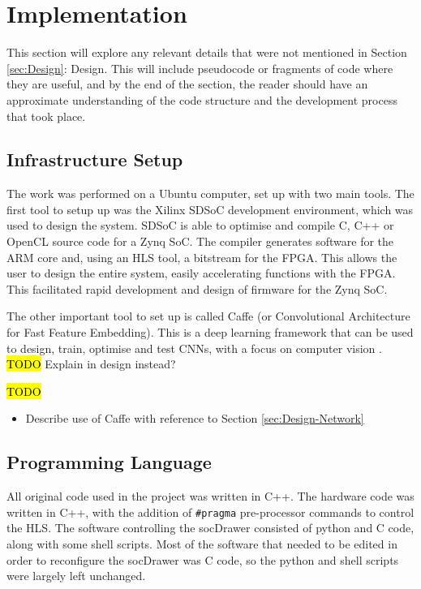 \documentclass[12pt]{article}
\begin{document}
\newpage

\section{Implementation}
\label{sec:Imp}


This section will explore any relevant details that were not mentioned in Section \ref{sec:Design}: Design. This will include pseudocode or fragments of code where they are useful, and by the end of the section, the reader should have an approximate understanding of the code structure and the development process that took place.

\subsection{Infrastructure Setup}
\label{sec:Imp-InfSetup}


The work was performed on a Ubuntu computer, set up with two main tools. The first tool to setup up was the Xilinx SDSoC development environment, which was used to design the system. SDSoC is able to optimise and compile C, C++ or OpenCL source code for a Zynq SoC. The compiler generates software for the ARM core and, using an HLS tool, a bitstream for the FPGA. This allows the user to design the entire system, easily accelerating functions with the FPGA. This facilitated rapid development and design of firmware for the Zynq SoC.

The other important tool to set up is called Caffe (or Convolutional Architecture for Fast Feature Embedding). This is a deep learning framework that can be used to design, train, optimise and test CNNs, with a focus on computer vision \cite{jia2014caffe}. \hl{TODO} Explain in design instead?



\hl{TODO}

\begin{itemize}
\item Describe use of Caffe with reference to Section \ref{sec:Design-Network}
\end{itemize}

\subsection{Programming Language}
\label{sec:Imp-Language}

All original code used in the project was written in C++. The hardware code was written in C++, with the addition of \lstinline|#pragma| pre-processor commands to control the HLS. The software controlling the socDrawer consisted of python and C code, along with some shell scripts. Most of the software that needed to be edited in order to reconfigure the socDrawer was C code, so the python and shell scripts were largely left unchanged.
\end{document}
